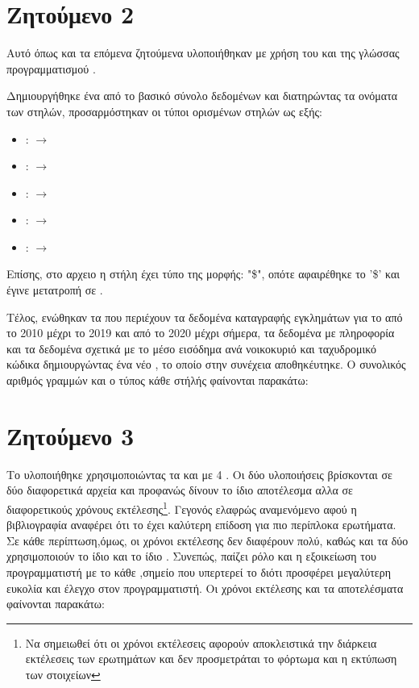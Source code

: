 \documentclass[11pt]{article}
\makeatletter
\newcommand{\readfirstline}[1]{%
  \openin\file@read=#1\relax
  \read\file@read to\@tempa
  \closein\file@read
  \@tempa
}
\makeatother
\begin{document}
\section*{Ζητούμενο 2}
Αυτό όπως και τα επόμενα ζητούμενα υλοποιήθηκαν με χρήση του  και της γλώσσας προγραμματισμού .
\par Δημιουργήθηκε ένα  από το βασικό σύνολο δεδομένων και διατηρώντας τα ονόματα των στηλών, προσαρμόστηκαν οι τύποι ορισμένων στηλών ως εξής:
\begin{itemize}
  \item {} :  $\rightarrow$ 
  \item {} :  $\rightarrow$ 
  \item {} :  $\rightarrow$ 
  \item {} :  $\rightarrow$ 
  \item {} :  $\rightarrow$ 
\end{itemize}
\par Επίσης, στο αρχειο  η στήλη   έχει τύπο  της μορφής: "\$", οπότε αφαιρέθηκε το '\$' και έγινε μετατροπή σε .
\par Τέλος, ενώθηκαν τα  που περιέχουν τα δεδομένα καταγραφής εγκλημάτων για το  από το 2010 μέχρι το 2019 και από το 2020 μέχρι σήμερα, τα δεδομένα με  πληροφορία και τα δεδομένα σχετικά με το μέσο εισόδημα ανά νοικοκυριό και ταχυδρομικό κώδικα δημιουργώντας ένα νέο , το οποίο στην συνέχεια αποθηκέυτηκε.
\newpage Ο συνολικός αριθμός γραμμών και ο τύπος κάθε στήλής φαίνονται παρακάτω:
\texten{}

\section*{Ζητούμενο 3}
Το  υλοποιήθηκε χρησιμοποιώντας τα  και  με 4 . Οι δύο υλοποιήσεις βρίσκονται σε δύο διαφορετικά αρχεία και προφανώς δίνουν το ίδιο αποτέλεσμα αλλα σε διαφορετικούς χρόνους εκτέλεσης\footnote[1]{Να σημειωθεί ότι οι χρόνοι εκτέλεσεις αφορούν αποκλειστικά την διάρκεια εκτέλεσεις των ερωτημάτων και δεν προσμετράται το φόρτωμα και η εκτύπωση των στοιχείων}. Γεγονός ελαφρώς αναμενόμενο αφού η βιβλιογραφία αναφέρει ότι το  έχει καλύτερη επίδοση για πιο περίπλοκα ερωτήματα. Σε κάθε περίπτωση,όμως, οι χρόνοι εκτέλεσης δεν διαφέρουν πολύ, καθώς και τα δύο  χρησιμοποιούν το ίδιο  και το ίδιο . Συνεπώς, παίζει ρόλο και η εξοικείωση του προγραμματιστή με το κάθε ,σημείο που υπερτερεί το  διότι προσφέρει μεγαλύτερη ευκολία και έλεγχο στον προγραμματιστή. 
Οι χρόνοι εκτέλεσης και τα αποτελέσματα φαίνονται παρακάτω: \break \break
\texten{\texttt{\readfirstline{outputs/Query1DF.txt}}}
\texten{}
\end{document}
